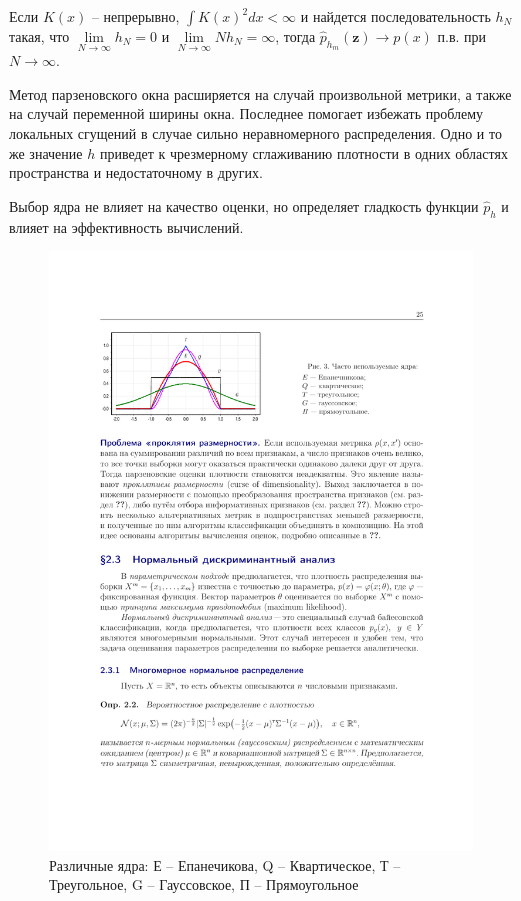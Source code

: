 \documentclass{article}
\begin{document}
Если $K(x)$ -- непрерывно, $\int K(x)^2 dx < \infty$ и найдется последовательность $h_N$ такая, что $\lim\limits_{N \rightarrow \infty}h_N = 0$ и $\lim\limits_{N \rightarrow \infty} Nh_N = \infty$, тогда $\widehat{p}_{h_m}(\mathbf{z}) \rightarrow p(x)$ п.в. при $N \rightarrow \infty$.

Метод парзеновского окна расширяется на случай произвольной метрики, а также на случай переменной ширины окна. Последнее помогает избежать проблему локальных сгущений в случае сильно неравномерного распределения. Одно и то же значение $h$ приведет к чрезмерному сглаживанию плотности в одних областях пространства и недостаточному в других.

Выбор ядра не влияет на качество оценки, но определяет гладкость функции $\widehat{p}_{h}$ и влияет на эффективность вычислений.

\begin{figure}[h]
  \begin{center}
  \includegraphics[width=0.8\linewidth]{kernels.pdf}
\end{center}
  \caption{Различные ядра: Е -- Епанечикова, Q -- Квартическое, Т -- Треугольное, G -- Гауссовское, П -- Прямоугольное}
  \label{fig:Kernels}
\end{figure}
\end{document}
